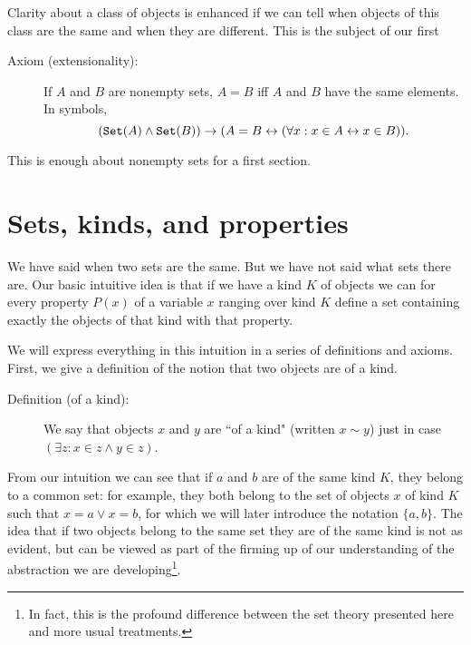 \documentclass[12pt]{article}
\begin{document}
Clarity about a class of objects is enhanced if we can tell when objects of this class are the same and when they are different.  This is the subject of our first

\begin{description}

\item[Axiom (extensionality):]  If $A$ and $B$ are nonempty sets, $A=B$ iff $A$ and $B$ have the same elements.  In symbols, $$({\tt Set}(A) \wedge {\tt Set}(B)) \rightarrow (A = B \leftrightarrow (\forall x:x \in A \leftrightarrow x \in B)).$$

\end{description}

This is enough about nonempty sets for a first section.

\newpage

\section{Sets, kinds, and properties}

We have said when two sets are the same.  But we have not said what sets there are.   Our basic intuitive idea is that if we have a kind $K$ of objects
we can for every property $P(x)$ of a variable $x$ ranging over kind $K$ define a set containing exactly the objects of that kind with that property.

We will express everything in this intuition in a series of definitions and axioms.  First, we give a definition of the notion that two objects are of a kind.

\begin{description}

\item[Definition (of a kind):]  We say that objects $x$ and $y$ are ``of a kind" (written $x \sim y$) just in case $(\exists z:x \in z \wedge y \in z)$.

\end{description}

From our intuition we can see that if $a$ and $b$ are of the same kind $K$, they belong to a common set:  for example, they both belong to the set of objects $x$ of kind $K$ such that $x=a \vee x=b$, for which we will later introduce the notation $\{a,b\}$.  The idea that if two objects belong to the same set they are of the same kind is not as evident, but can be viewed as part of the firming up of our understanding of the abstraction we are developing\footnote{In fact, this is the profound difference between the set theory presented here and more usual treatments.}.
\end{document}
